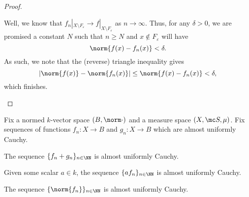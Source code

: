\documentclass[../notes.tex]{subfiles}
\begin{document}
\begin{proof}
\begin{listalph}
		Well, we know that $f_n|_{X\setminus F_\varepsilon}\to f|_{X\setminus F_\varepsilon}$ as $n\to\infty$. Thus, for any $\delta>0$, we are promised a constant $N$ such that $n\ge N$ and $x\notin F_\varepsilon$ will have
		\[\norm{f(x)-f_n(x)}<\delta.\]
		As such, we note that the (reverse) triangle inequality gives
		\[|\norm{f(x)}-\norm{f_n(x)}|\le\norm{f(x)-f_n(x)}<\delta,\]
		which finishes.
		\qedhere
	\end{listalph}
\end{proof}
\begin{lemma}
	Fix a normed $k$-vector space $(B,\norm\cdot)$ and a measure space $(X,\mc S,\mu)$. Fix sequences of functions $f_n\colon X\to B$ and $g_n\colon X\to B$ which are almost uniformly Cauchy.
	\begin{listalph}
		\item The sequence $\{f_n+g_n\}_{n\in\NN}$ is almost uniformly Cauchy.
		\item Given some scalar $a\in k$, the sequence $\{af_n\}_{n\in\NN}$ is almost uniformly Cauchy.
		\item The sequence $\{\norm{f_n}\}_{n\in\NN}$ is almost uniformly Cauchy.
	\end{listalph}
\end{lemma}
\end{document}
